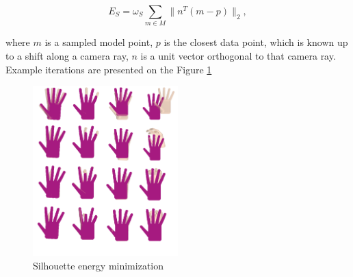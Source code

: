 \documentclass[tog]{acmsiggraph}
\begin{document}
\begin{equation}
	E_{S} = \omega_S \sum_{m \in M} \| n^T(m - p)\|_2,
\end{equation}

where $m$ is a sampled model point, $p$ is the closest data point, which is known up to a shift along a camera ray, $n$ is a unit vector orthogonal to that camera ray. Example iterations are presented on the Figure \ref{fig:silhouette}

\begin{figure}[h!] 
	\centering
	\hspace{0em}
	\includegraphics[width=0.5\textwidth]{fig/silhouette}
	\caption{Silhouette energy minimization}
	\label{fig:silhouette}
\end{figure}



 

\end{document}
